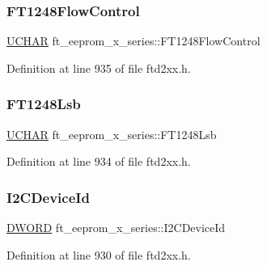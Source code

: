 \subsubsection{\texorpdfstring{F\+T1248\+Flow\+Control}{FT1248FlowControl}}
{\footnotesize\ttfamily \hyperlink{CatCaloProto40MHz_2inc_2WinTypes_8h_a4f4bb67531a9bf6f0b9c6ad76aeba587}{U\+C\+H\+AR} ft\+\_\+eeprom\+\_\+x\+\_\+series\+::\+F\+T1248\+Flow\+Control}



Definition at line 935 of file ftd2xx.\+h.

\mbox{\label{structft__eeprom__x__series_aed8eaabb6019562d67ab10a65d018376}} 
\subsubsection{\texorpdfstring{F\+T1248\+Lsb}{FT1248Lsb}}
{\footnotesize\ttfamily \hyperlink{CatCaloProto40MHz_2inc_2WinTypes_8h_a4f4bb67531a9bf6f0b9c6ad76aeba587}{U\+C\+H\+AR} ft\+\_\+eeprom\+\_\+x\+\_\+series\+::\+F\+T1248\+Lsb}



Definition at line 934 of file ftd2xx.\+h.

\mbox{\label{structft__eeprom__x__series_ab997d186140523a48b9b1186a9ef6f41}} 
\subsubsection{\texorpdfstring{I2\+C\+Device\+Id}{I2CDeviceId}}
{\footnotesize\ttfamily \hyperlink{CatCaloProto40MHz_2inc_2WinTypes_8h_ad342ac907eb044443153a22f964bf0af}{D\+W\+O\+RD} ft\+\_\+eeprom\+\_\+x\+\_\+series\+::\+I2\+C\+Device\+Id}



Definition at line 930 of file ftd2xx.\+h.

\mbox{\label{structft__eeprom__x__series_a1273bf5d26c7ef2f905ce6a1b3d936b4}} 
